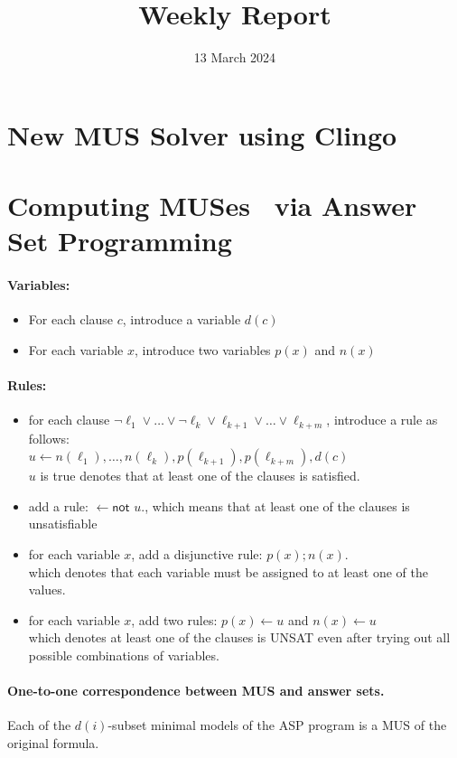 \documentclass{article}
\title{Weekly Report}
\begin{document}
\date{13 March 2024}
\section{New MUS Solver using Clingo}
\section{Computing MUSes~\cite{LPMM2016} via Answer Set Programming}
\paragraph{Variables:}
\begin{itemize}
    \item For each clause $c$, introduce a variable $d(c)$
    \item For each variable $x$, introduce two variables $p(x)$ and $n(x)$
\end{itemize}
\paragraph{Rules:}
\begin{itemize}
    \item for each clause $\neg{\ell_1} \vee \ldots \vee 
    \neg{\ell_k} \vee \ell_{k+1} \vee \ldots \vee \ell_{k+m}$, 
    introduce a rule as follows:\\
    $u \leftarrow n(\ell_1), \ldots, n(\ell_k), p(\ell_{k+1}), p(\ell_{k+m}), d(c)$\\
    $u$ is true denotes that at least one of the clauses is satisfied.
    \item add a rule: $\leftarrow \textsf{not } u.$,
    which means that at least one of the clauses is unsatisfiable
    \item for each variable $x$, add a disjunctive rule: $p(x) ; n(x).$\\
    which denotes that each variable must be assigned to at least one of the values.
    \item for each variable $x$, add two rules: $p(x) \leftarrow u$ and $n(x) \leftarrow u$\\
    which denotes at least one of the clauses is UNSAT even after trying out all possible combinations of variables.
\end{itemize}
\paragraph{One-to-one correspondence between MUS and answer sets.}
Each of the $d(i)$-subset minimal models of the ASP program is a MUS of the original formula. 
\end{document}
